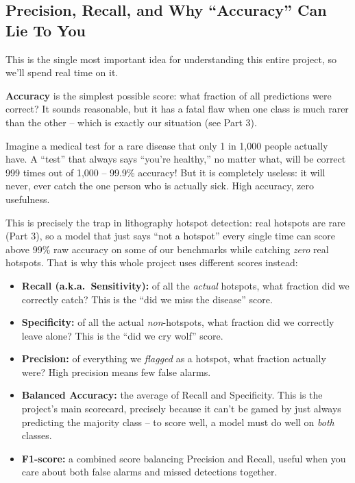\documentclass[11pt]{article}
\begin{document}
\subsection{Precision, Recall, and Why ``Accuracy'' Can Lie To You}
This is the single most important idea for understanding this entire
project, so we'll spend real time on it.

\textbf{Accuracy} is the simplest possible score: what fraction of all
predictions were correct? It sounds reasonable, but it has a fatal
flaw when one class is much rarer than the other -- which is exactly
our situation (see Part 3).

\begin{analogy}
Imagine a medical test for a rare disease that only 1 in 1,000 people
actually have. A ``test'' that always says ``you're healthy,'' no
matter what, will be correct 999 times out of 1,000 -- 99.9\%
accuracy! But it is completely useless: it will never, ever catch the
one person who is actually sick. High accuracy, zero usefulness.
\end{analogy}

This is precisely the trap in lithography hotspot detection: real
hotspots are rare (Part 3), so a model that just says ``not a
hotspot'' every single time can score above 99\% raw accuracy on some
of our benchmarks while catching \emph{zero} real hotspots. That is
why this whole project uses different scores instead:

\begin{itemize}[leftmargin=1.2em]
    \item \textbf{Recall (a.k.a.\ Sensitivity):} of all the
    \emph{actual} hotspots, what fraction did we correctly catch?
    This is the ``did we miss the disease'' score.
    \item \textbf{Specificity:} of all the actual \emph{non}-hotspots,
    what fraction did we correctly leave alone? This is the ``did we
    cry wolf'' score.
    \item \textbf{Precision:} of everything we \emph{flagged} as a
    hotspot, what fraction actually were? High precision means few
    false alarms.
    \item \textbf{Balanced Accuracy:} the average of Recall and
    Specificity. This is the project's main scorecard, precisely
    because it can't be gamed by just always predicting the majority
    class -- to score well, a model must do well on \emph{both}
    classes.
    \item \textbf{F1-score:} a combined score balancing Precision and
    Recall, useful when you care about both false alarms and missed
    detections together.
\end{itemize}
\end{document}
